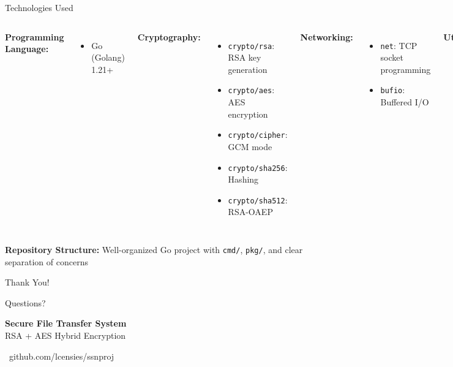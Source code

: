\documentclass[aspectratio=169]{beamer}
\begin{document}
\begin{frame}{Technologies Used}
\begin{columns}
\textbf{Programming Language:}
\begin{itemize}
    \item Go (Golang) 1.21+
\end{itemize}

\vspace{0.3cm}

\textbf{Cryptography:}
\begin{itemize}
    \item \texttt{crypto/rsa}: RSA key generation
    \item \texttt{crypto/aes}: AES encryption
    \item \texttt{crypto/cipher}: GCM mode
    \item \texttt{crypto/sha256}: Hashing
    \item \texttt{crypto/sha512}: RSA-OAEP
\end{itemize}

\textbf{Networking:}
\begin{itemize}
    \item \texttt{net}: TCP socket programming
    \item \texttt{bufio}: Buffered I/O
\end{itemize}

\vspace{0.3cm}

\textbf{Utilities:}
\begin{itemize}
    \item \texttt{go.uber.org/zap}: Structured logging
    \item \texttt{encoding/binary}: Binary protocol
    \item \texttt{filepath}: Path manipulation
\end{itemize}
\end{columns}

\vspace{0.5cm}

\begin{center}
\textbf{Repository Structure:} Well-organized Go project with \texttt{cmd/}, \texttt{pkg/}, and clear separation of concerns
\end{center}
\end{frame}

\begin{frame}
\centering
\Huge Thank You!

\vspace{1cm}

\Large Questions?

\vspace{1cm}

\normalsize
\textbf{Secure File Transfer System}\\
RSA + AES Hybrid Encryption

\vspace{0.5cm}

\faGithub~github.com/lcensies/ssnproj
\end{frame}
\end{document}

